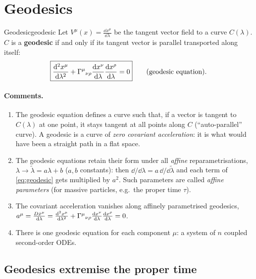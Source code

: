 \section{Geodesics}

\begin{definition}{Geodesic}{geodesic}
Let $V^\mu(x)=\frac{\dd x^\mu}{\dd\lambda}$ be the tangent vector field to a curve $C(\lambda)$. $C$ is a \textbf{geodesic} if and only if its tangent vector is parallel transported along itself:
\begin{equation}
  \boxed{\frac{\mathrm{d}^2x^\mu}{\mathrm{d}\lambda^2}+\Gamma^{\mu}{}_{\nu\rho}\frac{\mathrm{d} x^\nu}{\mathrm{d}\lambda}\frac{\mathrm{d} x^\rho}{\mathrm{d}\lambda}=0}\qquad\text{(geodesic equation)}.
  \label{eq:geodesic}
\end{equation}
\end{definition}
\paragraph{Comments.}
\begin{enumerate}
\item The geodesic equation defines a curve such that, if a vector is tangent to $C(\lambda)$ at one point, it stays tangent at all points along $C$ (``auto-parallel'' curve). A geodesic is a curve of \emph{zero covariant acceleration}: it is what would have been a straight path in a flat space.
\item The geodesic equations retain their form under all \emph{affine} reparametrisations, $\lambda\to\tilde\lambda=a\lambda+b$ ($a,b$ constants): then $\dd/\dd\lambda=a\,\dd/\dd\tilde\lambda$ and each term of \eqref{eq:geodesic} gets multiplied by $a^2$. Such parameters are called \emph{affine parameters} (for massive particles, e.g.\ the proper time $\tau$).
\item The covariant acceleration vanishes along affinely parametrised geodesics, $a^\mu=\frac{D\dot x^\mu}{\mathrm{d}\lambda}=\frac{\mathrm{d}^2x^\mu}{\mathrm{d}\lambda^2}+\Gamma^{\mu}{}_{\nu\rho}\frac{\mathrm{d} x^\nu}{\mathrm{d}\lambda}\frac{\mathrm{d} x^\rho}{\mathrm{d}\lambda}=0$.
\item There is one geodesic equation for each component $\mu$: a system of $n$ coupled second-order ODEs.
\end{enumerate}

\subsection{Geodesics extremise the proper time}

